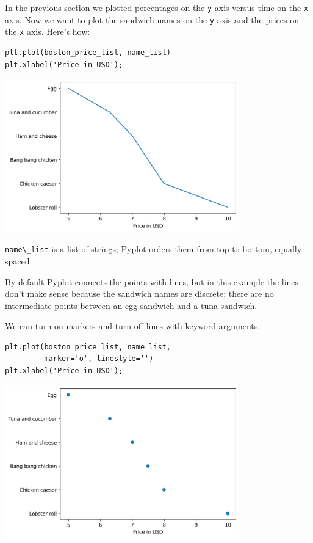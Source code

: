 In the previous section we plotted percentages on the
\passthrough{\lstinline!y!} axis versus time on the
\passthrough{\lstinline!x!} axis. Now we want to plot the sandwich names
on the \passthrough{\lstinline!y!} axis and the prices on the
\passthrough{\lstinline!x!} axis. Here's how:

\begin{lstlisting}[]
plt.plot(boston_price_list, name_list)
plt.xlabel('Price in USD');
\end{lstlisting}

\begin{center}
\includegraphics[width=4in]{chapters/06_plotting_files/06_plotting_38_0.png}
\end{center}

\passthrough{\lstinline!name\_list!} is a list of strings; Pyplot orders
them from top to bottom, equally spaced.

By default Pyplot connects the points with lines, but in this example
the lines don't make sense because the sandwich names are discrete;
there are no intermediate points between an egg sandwich and a tuna
sandwich.

We can turn on markers and turn off lines with keyword arguments.

\begin{lstlisting}[]
plt.plot(boston_price_list, name_list, 
         marker='o', linestyle='')
plt.xlabel('Price in USD');
\end{lstlisting}

\begin{center}
\includegraphics[width=4in]{chapters/06_plotting_files/06_plotting_40_0.png}
\end{center}

